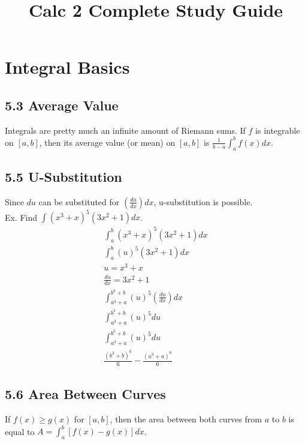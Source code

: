 \documentclass{article}
\title{Calc 2 Complete Study Guide}
\begin{document}
    \section{Integral Basics}
        \color{BrickRed}
        \subsection*{5.3 Average Value}
            Integrals are pretty much an infinite amount of Riemann sums.
            If $f$ is integrable on $[a, b]$, then its average value (or mean) on $[a, b]$ is $\frac{1}{b-a}\int_{a}^{b}f(x)dx$.
        \color{Violet}
        \subsection*{5.5 U-Substitution}
            Since $du$ can be substituted for $(\frac{du}{dx})dx$, u-substitution is possible.\\
            Ex. Find $\int (x^3 + x)^5(3x^2 + 1)dx$.
            \begin{equation}
                \begin{split}
                    \int_{a}^{b} (x^3 + x)^5(3x^2 + 1)dx\\
                    \int_{a}^{b} (u)^5(3x^2 + 1)dx\\
                    u = x^3 + x\\
                    \frac{du}{dx} = 3x^2 + 1 \\
                    \int_{a^3 + a}^{b^3 + b} (u)^5(\frac{du}{dx})dx\\
                    \int_{a^3 + a}^{b^3 + b} (u)^5du\\
                    \int_{a^3 + a}^{b^3 + b} (u)^5du\\
                    \frac{(b^3 + b)^6}{6} - \frac{(a^3 + a)^6}{6}
            \end{split}
                \end{equation}
        \color{NavyBlue}
        \subsection*{5.6 Area Between Curves}
            If $f(x) \geq g(x)$ for $[a, b]$, then the area between both curves from $a$ to $b$ is equal to $A = \int_{a}^{b} [f(x) - g(x)] dx$. 
        \color{ForestGreen}
\end{document}
